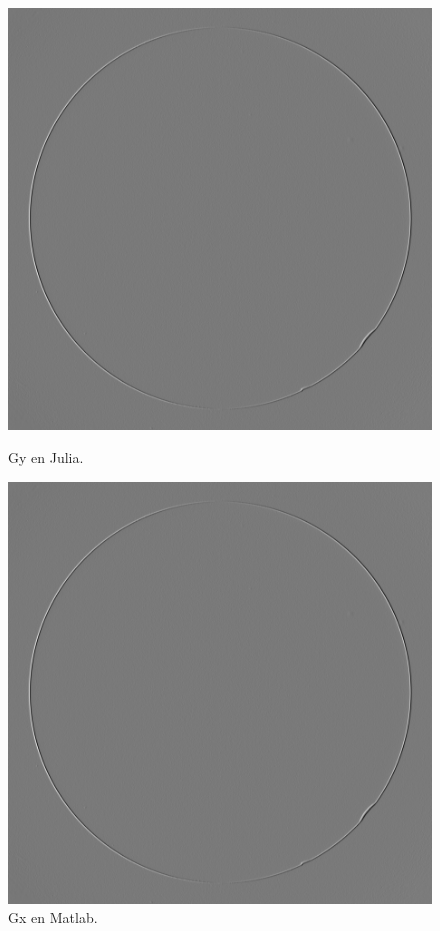 \documentclass[11pt, letterpaper]{article}
\begin{document}
\begin{figure}[h]
	
	\begin{minipage}{0.48\textwidth} %
		\centering
		\includegraphics[width=\textwidth]{IMG/q11.png} %
		\caption{Gy en Julia.}
		\label{fig:img4}
	\end{minipage}\hfill %
	\begin{minipage}{0.48\textwidth} %
		\centering
		\includegraphics[width=\textwidth]{IMG/q1.png} %
		\caption{Gx en Matlab.}
		\label{fig:img5}
	\end{minipage}
	

\end{figure}
\end{document}
